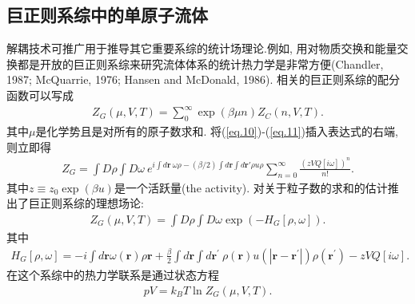 \subsection{巨正则系综中的单原子流体}
解耦技术可推广用于推导其它重要系综的统计场理论.例如,
用对物质交换和能量交换都是开放的巨正则系综来研究流体体系的统计热力学是非常方便(Chandler,
1987; McQuarrie, 1976; Hansen and McDonald, 1986).
相关的巨正则系综的配分函数可以写成
\label{subsec.equations}
   \begin{equation}
       \begin{aligned}
           Z_G(\mu, V ,T)=\sum_{0}^{\infty} \exp(\beta\mu n)Z_C(n, V,T).
       \end{aligned}
       \label{eq.24}      
    \end{equation}
其中$\mu$是化学势且是对所有的原子数求和.
将(\ref{eq.10})-(\ref{eq.11})插入表达式的右端,　则立即得
\label{subsec.equations}
   \begin{equation}
       \begin{aligned}
           Z_G=\int D\rho \int D\omega\ e^{i\int d\bm{r}\ 
           \omega\rho-(\beta/2)\int d\bm{r} \int d\bm{r{'}} \rho u
           \rho}\sum_{n=0}^{\infty}\frac{(zVQ[i\omega])^n}{n!}.
       \end{aligned}
       \label{eq.25}      
    \end{equation}
其中$z\equiv z_0\exp(\beta u)$是一个活跃量(the activity).
对关于粒子数的求和的估计推出了巨正则系综的理想场论:
\label{subsec.equations}
   \begin{equation}
       \begin{aligned}
           Z_G(\mu, V ,T)=\int D\rho \int D\omega \exp(-H_G[\rho, \omega]).
       \end{aligned}
       \label{eq.26}      
    \end{equation}
其中
\label{subsec.equations}
   \begin{equation}
       \begin{aligned}
           H_G[\rho, \omega]=-i\int
           d\bm{r}\omega(\bm{r})\rho{\bm{r}}+\frac{\beta}{2}\int d\bm{r}
           \int d\bm{r^{'}}\ \rho(\bm{r}) u(|\bm{r}-\bm{r^{'}}|)
           \rho(\bm{r^{'}})-zVQ[i\omega].
       \end{aligned}
       \label{eq.27}      
    \end{equation}
在这个系综中的热力学联系是通过状态方程
\label{subsec.equations}
   \begin{equation}
       \begin{aligned}
           pV=k_B T\ln Z_G(\mu, V, T).
       \end{aligned}
       \label{eq.28}      
    \end{equation}
